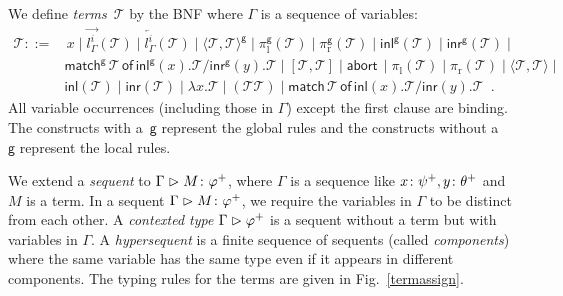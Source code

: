 \documentclass[doctor]{iscs-thesis}
\newcommand{\tr}{\vartriangleright}
\newcommand{\g} [0]{\mathsf{g}}
\newcommand{\lpair} [1]{\langle{#1}\rangle}
\newcommand{\gpair} [1]{\langle{#1}\rangle^{\g}}
\newcommand{\cotuple}[1]{[{#1}]}
\newcommand{\ginl}[1]{\mathsf{inl}^{\g}\left({#1}\right)}
\newcommand{\linl}[1]{\mathsf{inl}\left({#1}\right)}
\newcommand{\ginr}[1]{\mathsf{inr}^{\g}\left({#1}\right)}
\newcommand{\linr}[1]{\mathsf{inr}\left({#1}\right)}
\newcommand{\gpil}[1]{\pi^{\g}_{\mathrm l}\left({#1}\right)}
\newcommand{\lpil}[1]{\pi_{\mathrm l}\left({#1}\right)}
\newcommand{\gpir}[1]{\pi^{\g}_{\mathrm r}\left({#1}\right)}
\newcommand{\lpir}[1]{\pi_{\mathrm r}\left({#1}\right)}
\newcommand{\gmat}[5]{\mathsf{match}^{\g}\,{#1}\,\mathsf{of}\, \ginl{#2}. {#3}/
\ginr{#4}. {#5}}
\newcommand{\lmat}[5]{\mathsf{match}\,{#1}\,\mathsf{of}\, \linl{#2}. {#3}/
\linr{#4}. {#5}}
\newcommand{\ltor}[4]{\overrightarrow{{#2}^{#1}_{#3}} \left({#4}\right)}
\newcommand{\rtol}[4]{\overleftarrow{{#2}^{#1}_{#3}} \left({#4}\right)}
\newcommand{\abort}{\mathsf{abort\,}}
\newcommand{\term} [0]{\mathcal{T}}
\newcommand{\tj}   [2]{ {#1} \colon{#2} }
\begin{document}
We define \textit{terms}~$\term$ by the BNF
where $\Gamma$ is a sequence of variables:
\begin{align*}
\term ::=&\,
 x\mid \ltor i l \Gamma \term \mid \rtol i l \Gamma \term \mid
 \gpair {\term,\term}\mid
 \gpil \term \mid \gpir \term \mid
 \ginl\term \mid
 \ginr\term \mid \\ & \gmat \term x\term y \term \mid 
 \cotuple{\term,\term} \mid \abort \mid
  \lpil \term \mid \lpir \term \mid
 \lpair {\term,\term}\mid \\&
  \linl \term \mid  \linr \term \mid
 \lambda x.\term\mid (\term \term)
\mid \lmat \term x\term y \term \enspace.
\end{align*}
All variable occurrences (including those in $\Gamma$)
except the first clause are
binding.
The constructs with a~$\g$ represent the global rules and the
constructs without a~$\g$ represent the local rules.

We extend a \textit{sequent}
to $\Gamma\tr \tj M{\m \varphi}$, where $\Gamma$ is
a sequence like $\tj{x}{\m\psi}, \tj{y}{\m\theta}$ and $M$ is a term.
In a sequent $\Gamma\tr\tj{M}{\m\varphi}$, we require the variables in
$\Gamma$ to be distinct from each other.
A \textit{contexted type}
 $\Gamma\tr\m\varphi$ is a sequent without a term but with variables in
 $\Gamma$.
A \textit{hypersequent} is a finite sequence of sequents (called
\textit{components})
where the same
variable has the same type even if it appears in different components.
The typing rules for the terms are given in Fig.~\ref{termassign}.
\end{document}
